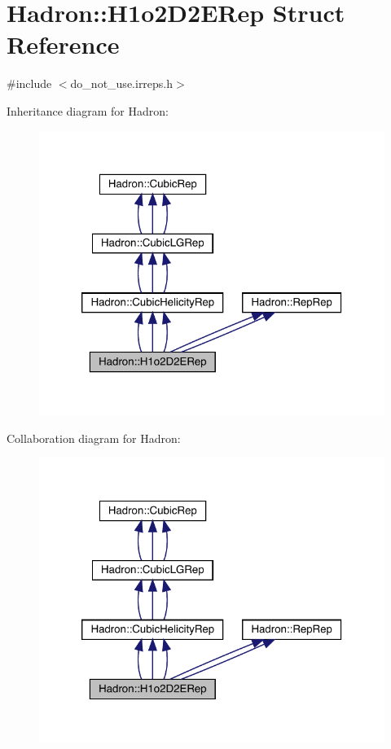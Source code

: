\hypertarget{structHadron_1_1H1o2D2ERep}{}\section{Hadron\+:\+:H1o2\+D2\+E\+Rep Struct Reference}
\label{structHadron_1_1H1o2D2ERep}


{\ttfamily \#include $<$do\+\_\+not\+\_\+use.\+irreps.\+h$>$}



Inheritance diagram for Hadron\+:
\nopagebreak
\begin{figure}[H]
\begin{center}
\leavevmode
\includegraphics[width=320pt]{db/d56/structHadron_1_1H1o2D2ERep__inherit__graph}
\end{center}
\end{figure}


Collaboration diagram for Hadron\+:
\nopagebreak
\begin{figure}[H]
\begin{center}
\leavevmode
\includegraphics[width=320pt]{d4/db7/structHadron_1_1H1o2D2ERep__coll__graph}
\end{center}
\end{figure}
